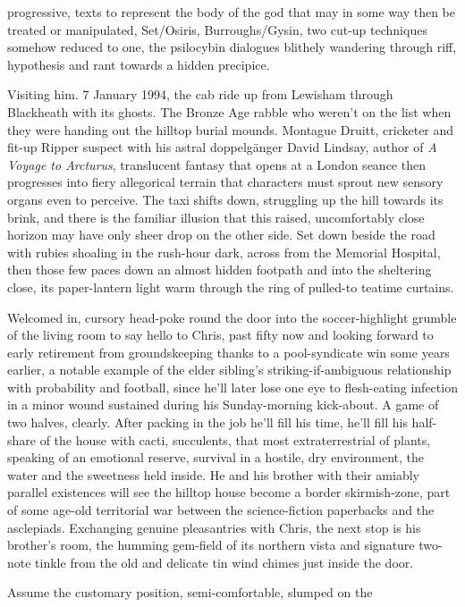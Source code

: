 \documentclass[
]{article}
\begin{document}
progressive, texts to represent the body of the god that may in some way
then be treated or manipulated, Set/Osiris, Burroughs/Gysin, two cut-up
techniques somehow reduced to one, the psilocybin dialogues blithely
wandering through riff, hypothesis and rant towards a hidden precipice. \par
Visiting him. 7 January 1994, the cab ride up from Lewisham
through Blackheath with its ghosts. The Bronze Age rabble who weren't on
the list when they were handing out the hilltop burial mounds. Montague
Druitt, cricketer and fit-up Ripper suspect with his astral doppelgänger
David Lindsay, author of \emph{A Voyage to Arcturus}, translucent
fantasy that opens at a London seance then progresses into fiery
allegorical terrain that characters must sprout new sensory organs even
to perceive. The taxi shifts down, struggling up the hill towards its
brink, and there is the familiar illusion that this raised,
uncomfortably close horizon may have only sheer drop on the other side.
Set down beside the road with rubies shoaling in the rush-hour dark,
across from the Memorial Hospital, then those few paces down an almost
hidden footpath and into the sheltering close, its paper-lantern light
warm through the ring of pulled-to teatime curtains. \par
Welcomed in, cursory head-poke round the door into the
soccer-highlight grumble of the living room to say hello to Chris, past
fifty now and looking forward to early retirement from groundskeeping
thanks to a pool-syndicate win some years earlier, a notable example of
the elder sibling's striking-if-ambiguous relationship with probability
and football, since he'll later lose one eye to flesh-eating infection
in a minor wound sustained during his Sunday-morning kick-about. A game
of two halves, clearly. After packing in the job he'll fill his time,
he'll fill his half-share of the house with cacti, succulents, that most
extraterrestrial of plants, speaking of an emotional reserve, survival
in a hostile, dry environment, the water and the sweetness held inside.
He and his brother with their amiably parallel existences will see the
hilltop house become a border skirmish-zone, part of some age-old
territorial war between the science-fiction paperbacks and the
asclepiads. Exchanging genuine pleasantries with Chris, the next stop is
his brother's room, the humming gem-field of its northern vista and
signature two-note tinkle from the old and delicate tin wind chimes just
inside the door. \par
Assume the customary position, semi-comfortable, slumped on the
\end{document}
